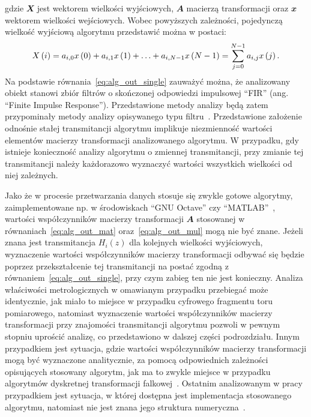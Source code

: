 gdzie $\mathbfit{X}$ jest wektorem wielkości wyjściowych, $\mathbfit{A}$ macierzą transformacji oraz $\mathbfit{x}$ wektorem wielkości wejściowych. Wobec powyższych zależności, pojedynczą wielkość wyjściową algorytmu przedstawić można w postaci:
\begin{equation}
X \left(i\right) = a_{i, 0} x \left(0\right) + a_{i, 1} x \left(1\right) + \hdots + a_{i, N-1} x \left(N-1\right) = \sum _{j = 0} ^{N-1} a_{i,j} x \left(j\right) \label{eq:alg_out_single}.
\end{equation}
Na podstawie równania~\eqref{eq:alg_out_single} zauważyć można, że analizowany obiekt stanowi zbiór filtrów o skończonej odpowiedzi impulsowej \enquote{FIR} (ang. \enquote{Finite Impulse Response}). Przedstawione metody analizy będą zatem przypominały metody analizy opisywanego typu filtru~\cite{mehrnia_fir}. Przedstawione założenie odnośnie stałej transmitancji algorytmu implikuje niezmienność wartości elementów macierzy transformacji analizowanego algorytmu. W przypadku, gdy istnieje konieczność analizy algorytmu o zmiennej transmitancji, przy zmianie tej transmitancji należy każdorazowo wyznaczyć wartości wszystkich wielkości od niej zależnych.

Jako że w procesie przetwarzania danych stosuje się zwykle gotowe algorytmy, zaimplementowane np. w środowiskach \enquote{GNU Octave} czy \enquote{MATLAB}~\cite{pruuvsa_dwt, lee_pywavelets}, wartości współczynników macierzy transformacji $\mathbfit{A}$ stosowanej w równaniach~\eqref{eq:alg_out_mat} oraz~\eqref{eq:alg_out_mul} mogą nie być znane. Jeżeli znana jest transmitancja $H_{i}(z)$ dla kolejnych wielkości wyjściowych, wyznaczenie wartości współczynników macierzy transformacji odbywać się będzie poprzez przekształcenie tej transmitancji na postać zgodną z równaniem~\eqref{eq:alg_out_single}, przy czym zabieg ten nie jest konieczny. Analiza właściwości metrologicznych w omawianym przypadku przebiegać może identycznie, jak miało to miejsce w przypadku cyfrowego fragmentu toru pomiarowego, natomiast wyznaczenie wartości współczynników macierzy transformacji przy znajomości transmitancji algorytmu pozwoli w pewnym stopniu uprościć analizę, co przedstawiono w dalszej części podrozdziału. Innym przypadkiem jest sytuacja, gdzie wartości współczynników macierzy transformacji mogą być wyznaczone analitycznie, za pomocą odpowiednich zależności opisujących stosowany algorytm, jak ma to zwykle miejsce w przypadku algorytmów dyskretnej transformacji falkowej~\cite{vonesch_dbbasics}. Ostatnim analizowanym w pracy przypadkiem jest sytuacja, w której dostępna jest implementacja stosowanego algorytmu, natomiast nie jest znana jego struktura numeryczna~\cite{misiti_matlabwav}.


